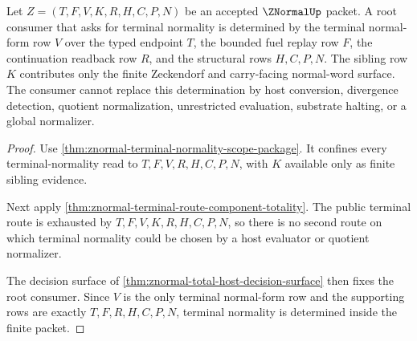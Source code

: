 \begin{theorem}
\label{thm:znormal-root-terminal-normality-determinacy}
Let $Z=(T,F,V,K,R,H,C,P,N)$ be an accepted $\ZNormalUp$ packet. A root consumer that asks for terminal normality is determined by the terminal normal-form row $V$ over the typed endpoint $T$, the bounded fuel replay row $F$, the continuation readback row $R$, and the structural rows $H,C,P,N$. The sibling row $K$ contributes only the finite Zeckendorf and carry-facing normal-word surface. The consumer cannot replace this determination by host conversion, divergence detection, quotient normalization, unrestricted evaluation, substrate halting, or a global normalizer.
\end{theorem}
\begin{proof}
Use \autoref{thm:znormal-terminal-normality-scope-package}. It confines every terminal-normality read to $T,F,V,R,H,C,P,N$, with $K$ available only as finite sibling evidence.

Next apply \autoref{thm:znormal-terminal-route-component-totality}. The public terminal route is exhausted by $T,F,V,K,R,H,C,P,N$, so there is no second route on which terminal normality could be chosen by a host evaluator or quotient normalizer.

The decision surface of \autoref{thm:znormal-total-host-decision-surface} then fixes the root consumer. Since $V$ is the only terminal normal-form row and the supporting rows are exactly $T,F,R,H,C,P,N$, terminal normality is determined inside the finite packet.
\end{proof}

